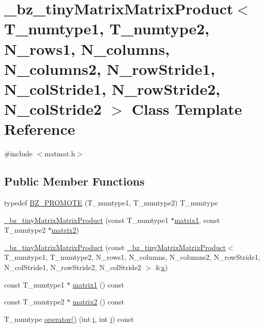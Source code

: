 \hypertarget{class__bz__tinyMatrixMatrixProduct}{}\section{\+\_\+bz\+\_\+tiny\+Matrix\+Matrix\+Product$<$ T\+\_\+numtype1, T\+\_\+numtype2, N\+\_\+rows1, N\+\_\+columns, N\+\_\+columns2, N\+\_\+row\+Stride1, N\+\_\+col\+Stride1, N\+\_\+row\+Stride2, N\+\_\+col\+Stride2 $>$ Class Template Reference}
\label{class__bz__tinyMatrixMatrixProduct}


{\ttfamily \#include $<$matmat.\+h$>$}

\subsection*{Public Member Functions}
\begin{DoxyCompactItemize}
\item 
typedef \hyperlink{class__bz__tinyMatrixMatrixProduct_a7ca3db7ea728f2d916b35707afac83ea}{B\+Z\+\_\+\+P\+R\+O\+M\+O\+T\+E} (T\+\_\+numtype1, T\+\_\+numtype2) T\+\_\+numtype
\item 
\hyperlink{class__bz__tinyMatrixMatrixProduct_ab60632ef49835b5d90ffba79c95121fe}{\+\_\+bz\+\_\+tiny\+Matrix\+Matrix\+Product} (const T\+\_\+numtype1 $\ast$\hyperlink{class__bz__tinyMatrixMatrixProduct_a34772dda93dd8e71c7acae3170f690e6}{matrix1}, const T\+\_\+numtype2 $\ast$\hyperlink{class__bz__tinyMatrixMatrixProduct_a8ffa39333bec029fed5270645c51d493}{matrix2})
\item 
\hyperlink{class__bz__tinyMatrixMatrixProduct_a98a5a1365f66a2714b9f630d00ec7473}{\+\_\+bz\+\_\+tiny\+Matrix\+Matrix\+Product} (const \hyperlink{class__bz__tinyMatrixMatrixProduct}{\+\_\+bz\+\_\+tiny\+Matrix\+Matrix\+Product}$<$ T\+\_\+numtype1, T\+\_\+numtype2, N\+\_\+rows1, N\+\_\+columns, N\+\_\+columns2, N\+\_\+row\+Stride1, N\+\_\+col\+Stride1, N\+\_\+row\+Stride2, N\+\_\+col\+Stride2 $>$ \&\hyperlink{vecnorm1_8cc_ac73eed9e41ec09d58f112f06c2d6cb63}{x})
\item 
const T\+\_\+numtype1 $\ast$ \hyperlink{class__bz__tinyMatrixMatrixProduct_a34772dda93dd8e71c7acae3170f690e6}{matrix1} () const 
\item 
const T\+\_\+numtype2 $\ast$ \hyperlink{class__bz__tinyMatrixMatrixProduct_a8ffa39333bec029fed5270645c51d493}{matrix2} () const 
\item 
T\+\_\+numtype \hyperlink{class__bz__tinyMatrixMatrixProduct_a73613bdf0f18b71812cddb5cd1e98fd2}{operator()} (int \hyperlink{indexexpr_8h_aabd77643995707c185e95c8cb2782c81}{i}, int \hyperlink{indexexpr_8h_aa1f3325d66516548e69238097857fa98}{j}) const 
\end{DoxyCompactItemize}
